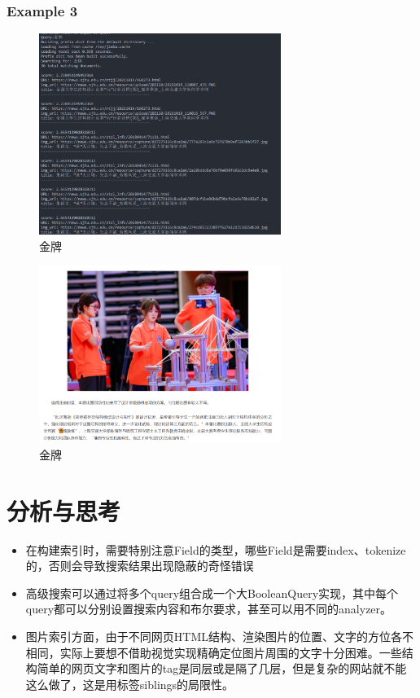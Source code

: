 \documentclass[12pt,a4paper]{article}
\begin{document}
\subsubsection{Example 3}
\begin{figure}[H]
	\includegraphics[width=0.7\textwidth]{q50.png}
	\centering
	 \caption{金牌}
\end{figure}
\begin{figure}[H]
	\includegraphics[width=0.7\textwidth]{q51.png}
	\centering
	 \caption{金牌}

\end{figure}

\section{分析与思考}
\begin{itemize}
	\item 在构建索引时，需要特别注意Field的类型，哪些Field是需要index、tokenize的，否则会导致搜索结果出现隐蔽的奇怪错误
	\item 高级搜索可以通过将多个query组合成一个大BooleanQuery实现，其中每个query都可以分别设置搜索内容和布尔要求，甚至可以用不同的analyzer。
	\item 图片索引方面，由于不同网页HTML结构、渲染图片的位置、文字的方位各不相同，实际上要想不借助视觉实现精确定位图片周围的文字十分困难。一些结构简单的网页文字和图片的tag是同层或是隔了几层，但是复杂的网站就不能这么做了，这是用标签siblings的局限性。
\end{itemize}
\end{document}
